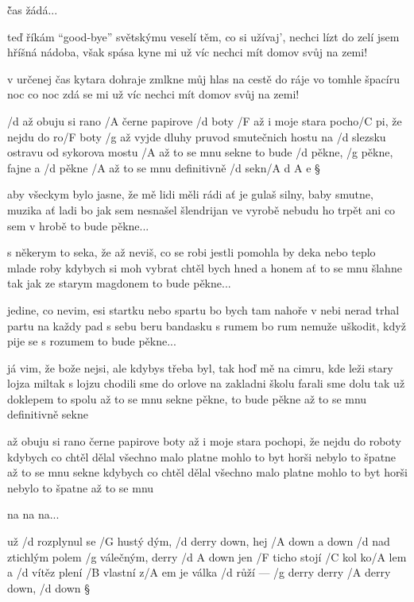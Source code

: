 \r čas žádá...

teď říkám ``good-bye'' světskýmu veselí
těm, co si užívaj', nechci lízt do zelí
jsem hříšná nádoba, však spása kyne mi
už víc nechci mít domov svůj na zemi!

\rr

v určenej čas kytara dohraje
zmlkne můj hlas na cestě do ráje
vo tomhle špacíru noc co noc zdá se mi
už víc nechci mít domov svůj na zemi!

\rr




/d až obuju si rano /A černe papirove /d boty
/F až i moje stara pocho/C pi, že nejdu do ro/F boty
/g až vyjde dluhy pruvod smutečnich hostu
na /d slezsku ostravu od sykorova mostu
/A až to se mnu sekne
to bude /d pěkne, /g pěkne, fajne a /d pěkne
/A až to se mnu definitivně /d sekn/{A d A} e \S

aby všeckym bylo jasne, že mě lidi měli rádi
ať je gulaš silny, baby smutne, muzika ať ladi
bo jak sem nesnašel šlendrijan ve vyrobě
nebudu ho trpět ani co sem v hrobě
to bude pěkne... \s

s někerym to seka, že až neviš, co se robi
jestli pomohla by deka nebo teplo mlade roby
kdybych si moh vybrat chtěl bych hned a honem
ať to se mnu šlahne tak jak ze starym magdonem
to bude pěkne... \s

jedine, co nevim, esi startku nebo spartu
bo bych tam nahoře v nebi nerad trhal partu
na každy pad s sebu beru bandasku s rumem
bo rum nemuže uškodit, když pije se s rozumem
to bude pěkne... \s

já vim, že bože nejsi, ale kdybys třeba byl, tak
hoď mě na cimru, kde leži stary lojza miltak
s lojzu chodili sme do orlove na zakladni školu
farali sme dolu tak už doklepem to spolu
až to se mnu sekne
pěkne, to bude pěkne
až to se mnu definitivně sekne \s

až obuju si rano černe papirove boty
až i moje stara pochopi, že nejdu do roboty
kdybych co chtěl dělal všechno malo platne
mohlo to byt horši nebylo to špatne
až to se mnu sekne
kdybych co chtěl dělal všechno malo platne
mohlo to byt horši nebylo to špatne
až to se mnu \s

na na na...




už /d rozplynul se /G hustý dým, /d derry down, hej /A down a down
/d nad ztichlým polem /g válečným, derry /{d A} down
jen /F ticho stojí /C kol ko/A lem a /d vítěz plení /B vlastní z/A em
je válka /d růží --- /g derry derry /A derry down, /d down \S

